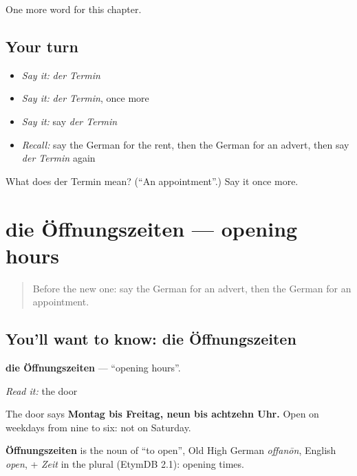 \begin{grammarlens}[title={What you've built}]
One more word for this chapter.
\end{grammarlens}

\subsection*{Your turn}
\begin{itemize}
\raggedright
  \item \emph{Say it:} \emph{der Termin}
  \item \emph{Say it:} \emph{der Termin}, once more
  \item \emph{Say it:} say \emph{der Termin}
  \item \emph{Recall:} say the German for the rent, then the German for an advert, then say \emph{der Termin} again
\end{itemize}

\begin{tcolorbox}[breakable,colback=teal!4,colframe=teal!35!black,title={Before you move on}]
What does der Termin mean? (\textquotedblleft{}An appointment\textquotedblright{}.) Say it once more.
\end{tcolorbox}
\section[die Öffnungszeiten]{die Öffnungszeiten — opening hours}

\label{lesson:GE-C143-oeffnungszeiten}



\begin{quote}
Before the new one: say the German for an advert, then the German for an appointment.
\end{quote}

\subsection*{You'll want to know: die Öffnungszeiten}
\textbf{die Öffnungszeiten} — \textquotedblleft{}opening hours\textquotedblright{}.

\emph{Read it:} the door

The door says \textbf{Montag bis Freitag, neun bis achtzehn Uhr.} Open on weekdays from nine to six: not on Saturday.

\begin{cousinweb}
\textbf{Öffnungszeiten} is the noun of \textquotedblleft{}to open\textquotedblright{}, Old High German \emph{offanōn}, English \emph{open}, + \emph{Zeit} in the plural (EtymDB 2.1): opening times.
\end{cousinweb}

